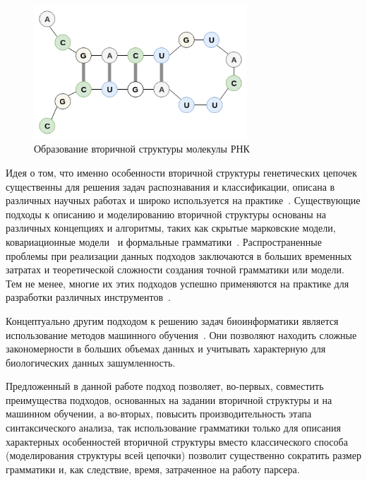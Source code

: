 \documentclass[14pt]{matmex-diploma-custom}
\begin{document}
\begin{figure}[h]
\begin{center}
\centering
\includegraphics[width=8cm]{molekula.png}
\caption{Образование вторичной структуры молекулы РНК}
\label{molekula}
\end{center}
\end{figure}    
Идея о том, что именно особенности вторичной структуры генетических цепочек существенны для решения задач распознавания и классификации, описана в различных научных работах и широко используется на практике~\cite{miladi2017rnascclust, vrehakova2014variation}.
Существующие подходы к описанию и моделированию вторичной структуры основаны на различных концепциях и алгоритмы, таких как скрытые марковские модели, ковариационные модели~\cite{EddyDurbin} и формальные грамматики~\cite{GrammarsRNA,PCFG,LWPCFG}. Распространенные проблемы при реализации данных подходов заключаются в больших временных затратах и теоретической сложности создания точной грамматики или модели. Тем не менее, многие их этих подходов успешно применяются на практике для разработки различных инструментов~\cite{hmmer,infernal}.

Концептуально другим подходом к решению задач биоинформатики является использование методов машинного обучения~\cite{Humidor,ANN}. Они позволяют находить сложные закономерности в больших объемах данных и учитывать характерную для биологических данных зашумленность.

Предложенный в данной работе подход позволяет, во-первых, совместить преимущества подходов, основанных на задании вторичной структуры и на машинном обучении, а во-вторых, повысить производительность этапа синтаксического анализа, так использование грамматики только для описания характерных особенностей вторичной структуры вместо классического способа (моделирования структуры всей цепочки) позволит существенно сократить размер грамматики и, как следствие, время, затраченное на работу парсера.
\end{document}
